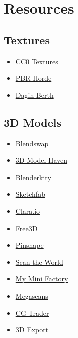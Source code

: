 \section{Resources}
\hypertarget{rsrc:textures}{\subsection{Textures}}
\begin{itemize}
      \item \href{https://cc0textures.com/}{CC0 Textures}
      \item \href{https://www.pbrhorde.com/}{PBR Horde}
      \item \href{https://daginberth.net/}{Dagin Berth}
\end{itemize}




\hypertarget{rsrc:models}{\subsection{3D Models}}
\begin{itemize}
      \item \href{https://www.blendswap.com/}{Blendswap}
      \item \href{https://3dmodelhaven.com/}{3D Model Haven}
      \item \href{https://www.blenderkit.com/asset-gallery}{Blenderkity}
      \item \href{https://sketchfab.com/3d-models?features=downloadable}{Sketchfab}
      \item \href{https://clara.io/library}{Clara.io}
      \item \href{https://free3d.com/3d-models/}{Free3D}
      \item \href{https://pinshape.com/}{Pinshape}
      \item \href{https://www.myminifactory.com/scantheworld/}{Scan the World}
      \item \href{https://www.myminifactory.com/pages/explore}{My Mini Factory}
      \item \href{https://quixel.com/megascans/home}{Megascans}
      \item \href{https://www.cgtrader.com/free-3d-models}{CG Trader}
      \item \href{https://3dexport.com/free-3d-models}{3D Export}
\end{itemize}



